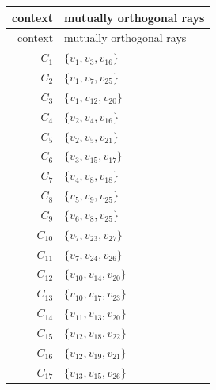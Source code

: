 \begin{longtable}{@{}r l@{}}
\toprule
context & mutually orthogonal rays\\
\midrule
\endfirsthead
\toprule
context & mutually orthogonal rays\\
\midrule
\endhead
$C_{1}$ & $\{v_{1},v_{3},v_{16}\}$\\
$C_{2}$ & $\{v_{1},v_{7},v_{25}\}$\\
$C_{3}$ & $\{v_{1},v_{12},v_{20}\}$\\
$C_{4}$ & $\{v_{2},v_{4},v_{16}\}$\\
$C_{5}$ & $\{v_{2},v_{5},v_{21}\}$\\
$C_{6}$ & $\{v_{3},v_{15},v_{17}\}$\\
$C_{7}$ & $\{v_{4},v_{8},v_{18}\}$\\
$C_{8}$ & $\{v_{5},v_{9},v_{25}\}$\\
$C_{9}$ & $\{v_{6},v_{8},v_{25}\}$\\
$C_{10}$ & $\{v_{7},v_{23},v_{27}\}$\\
$C_{11}$ & $\{v_{7},v_{24},v_{26}\}$\\
$C_{12}$ & $\{v_{10},v_{14},v_{20}\}$\\
$C_{13}$ & $\{v_{10},v_{17},v_{23}\}$\\
$C_{14}$ & $\{v_{11},v_{13},v_{20}\}$\\
$C_{15}$ & $\{v_{12},v_{18},v_{22}\}$\\
$C_{16}$ & $\{v_{12},v_{19},v_{21}\}$\\
$C_{17}$ & $\{v_{13},v_{15},v_{26}\}$\\
\bottomrule
\end{longtable}
